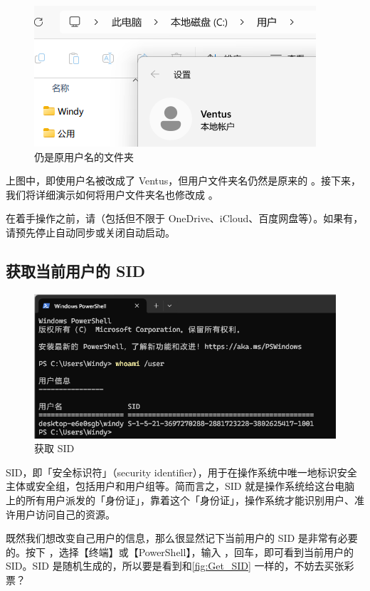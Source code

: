 {{{\begin{figure}[htb!]
  \centering
  \includegraphics[width=.5\textwidth]{assets/advanced/Unchanged_User_Folder.png}
  \caption{仍是原用户名的文件夹}
  \label{fig:Unchanged_User_Folder}
\end{figure}

上图中，即使用户名被改成了 Ventus，但用户文件夹名仍然是原来的 。接下来，我们将详细演示如何将用户文件夹名也修改成 。

\begin{danger}
  在着手操作之前，请（包括但不限于 OneDrive、iCloud、百度网盘等）。如果有，请预先停止自动同步或关闭自动启动。
\end{danger}

\subsection{获取当前用户的 SID}

\begin{figure}[htb!]
  \centering
  \includegraphics[width=.6\textwidth]{assets/advanced/Get_SID.png}
  \caption{获取 SID}
  \label{fig:Get_SID}
\end{figure}

SID，即「安全标识符」（security identifier），用于在操作系统中唯一地标识安全主体或安全组，包括用户和用户组等。简而言之，SID 就是操作系统给这台电脑上的所有用户派发的「身份证」，靠着这个「身份证」，操作系统才能识别用户、准许用户访问自己的资源。

既然我们想改变自己用户的信息，那么很显然记下当前用户的 SID 是非常有必要的。按下 ，选择【终端】或【PowerShell】，输入 ，回车，即可看到当前用户的 SID。SID 是随机生成的，所以要是看到和\autoref{fig:Get_SID} 一样的，不妨去买张彩票？

}}}
